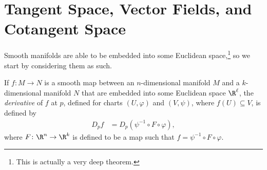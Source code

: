 \documentclass[10pt]{mypackage}
\begin{document}
\section{Tangent Space, Vector Fields, and Cotangent Space}%
Smooth manifolds are able to be embedded into some Euclidean space,\footnote{This is actually a very deep theorem.} so we start by considering them as such.
\begin{definition}
  If $f\colon M\rightarrow N$ is a smooth map between an $n$-dimensional manifold $M$ and a $k$-dimensional manifold $N$ that are embedded into some Euclidean space $\R^{\ell}$, the \textit{derivative} of $f$ at $p$, defined for charts $\left( U,\varphi \right)$ and $\left( V,\psi \right)$, where $f(U)\subseteq V$, is defined by
  \begin{align*}
    D_{p}f &= D_{p}\left( \psi^{-1}\circ F\circ \varphi \right),
  \end{align*}
  where $F\colon \R^{n}\rightarrow \R^{k}$ is defined to be a map such that $f = \psi^{-1}\circ F \circ \varphi$.
\end{definition}
\end{document}
